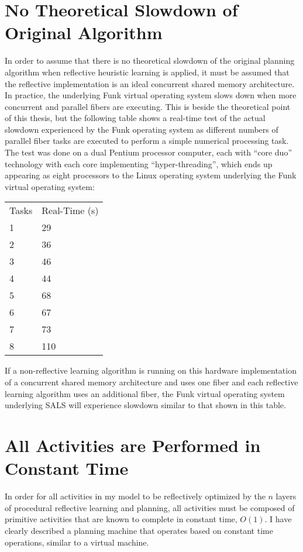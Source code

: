 \section{No Theoretical Slowdown of Original Algorithm}

In order to assume that there is no theoretical slowdown of the
original planning algorithm when reflective heuristic learning is
applied, it must be assumed that the reflective implementation is an
ideal concurrent shared memory architecture.  In practice, the
underlying Funk virtual operating system slows down when more
concurrent and parallel fibers are executing.  This is beside the
theoretical point of this thesis, but the following table shows a
real-time test of the actual slowdown experienced by the Funk
operating system as different numbers of parallel fiber tasks are
executed to perform a simple numerical processing task.  The test was
done on a dual Pentium processor computer, each with ``core duo''
technology with each core implementing ``hyper-threading'', which ends
up appearing as eight processors to the Linux operating system
underlying the Funk virtual operating system:

\vspace{5mm}
\begin{tabular}{ll}
Tasks & Real-Time (s) \\
1 & 29\\
2 & 36\\
3 & 46\\
4 & 44\\
5 & 68\\
6 & 67\\
7 & 73\\
8 & 110\\
\end{tabular}
\vspace{5mm}

If a non-reflective learning algorithm is running on this hardware
implementation of a concurrent shared memory architecture and uses one
fiber and each reflective learning algorithm uses an additional fiber,
the Funk virtual operating system underlying SALS will experience
slowdown similar to that shown in this table.

\section{All Activities are Performed in Constant Time}

In order for all activities in my model to be reflectively optimized
by the $n$ layers of procedural reflective learning and planning, all
activities must be composed of primitive activities that are known to
complete in constant time, $O(1)$.  I have clearly described a
planning machine that operates based on constant time operations,
similar to a virtual machine.

